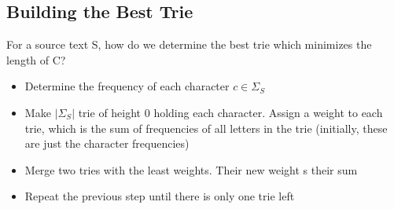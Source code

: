 \documentclass{report}
\begin{document}
\subsection{Building the Best Trie}
For a source text S, how do we determine the best trie which minimizes the length of C?
\begin{itemize}
\item Determine the frequency of each character $c \in \Sigma_S$
\item Make $|\Sigma_S|$ trie of height 0 holding each character. Assign a weight to each trie, which is the sum of frequencies of all letters in the trie (initially, these are just the character frequencies)
\item Merge two tries with the least weights. Their new weight s their sum
\item Repeat the previous step until there is only one trie left
\end{itemize}

\end{document}
